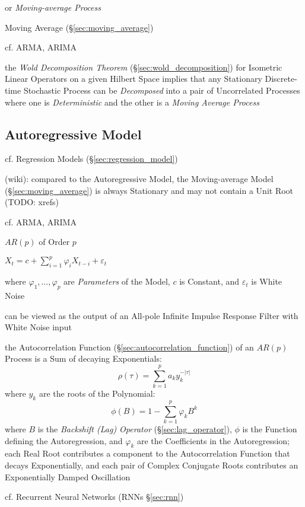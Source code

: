 or \emph{Moving-average Process}

Moving Average (\S\ref{sec:moving_average})

cf. ARMA, ARIMA

the \emph{Wold Decomposition Theorem} (\S\ref{sec:wold_decomposition}) for
Isometric Linear Operators on a given Hilbert Space implies that any Stationary
Discrete-time Stochastic Process can be \emph{Decomposed} into a pair of
Uncorrelated Processes where one is \emph{Deterministic} and the other is a
\emph{Moving Average Process}



\subsection{Autoregressive Model}\label{sec:autoregressive_model}

cf. Regression Models (\S\ref{sec:regression_model})

(wiki): compared to the Autoregressive Model, the Moving-average Model
(\S\ref{sec:moving_average}) is always Stationary and may not contain a Unit
Root (TODO: xrefs)

cf. ARMA, ARIMA

$AR(p)$ of Order $p$

$X_t = c + \sum_{i=1}^p \varphi_i X_{t-i} + \varepsilon_t$

where $\varphi_1, \ldots, \varphi_p$ are \emph{Parameters} of the Model, $c$ is
Constant, and $\varepsilon_t$ is White Noise

can be viewed as the output of an All-pole Infinite Impulse Response Filter with
White Noise input

the Autocorrelation Function (\S\ref{sec:autocorrelation_function}) of an
$AR(p)$ Process is a Sum of decaying Exponentials:
\[
  \rho(\tau) = \sum_{k=1}^p a_k y_k^{-|\tau|}
\]
where $y_k$ are the roots of the Polynomial:
\[
  \phi(B) = 1 - \sum_{k=1}^p \varphi_k B^k
\]
where $B$ is the \emph{Backshift (Lag) Operator} (\S\ref{sec:lag_operator}),
$\phi$ is the Function defining the Autoregression, and $\varphi_k$ are the
Coefficients in the Autoregression;
each Real Root contributes a component to the Autocorrelation Function that
decays Exponentially, and each pair of Complex Conjugate Roots contributes an
Exponentially Damped Oscillation

\fist cf. Recurrent Neural Networks (RNNs \S\ref{sec:rnn})

